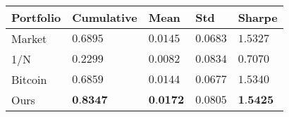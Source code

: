 \begin{tabularx}{\linewidth}{*{5}{X}}
\toprule
Portfolio & Cumulative & Mean & Std & Sharpe \\
\midrule
Market & $0.6895$ & $0.0145$ & $0.0683$ & $1.5327$\\
1/N & $0.2299$ & $0.0082$ & $0.0834$ & $0.7070$\\
Bitcoin & $0.6859$ & $0.0144$ & $0.0677$ & $1.5340$\\
Ours & $\textbf{0.8347}$ & $\textbf{0.0172}$ & $0.0805$ & $\textbf{1.5425}$\\
\bottomrule
\end{tabularx}
